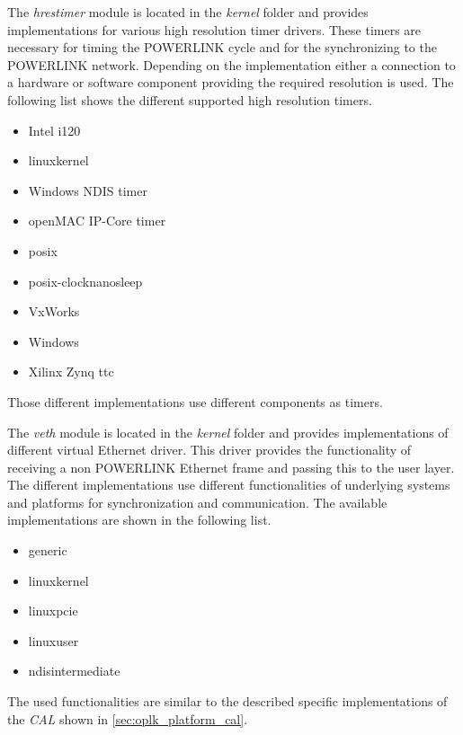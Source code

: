 \begin{description}[leftmargin=1cm]
    \item[hrestimer] The \emph{hrestimer} module is located in the \emph{kernel} folder and provides implementations for various high resolution timer drivers.
    These timers are necessary for timing the POWERLINK cycle and for the synchronizing to the POWERLINK network.
    Depending on the implementation either a connection to a hardware or software component providing the required resolution is used.
    The following list shows the different supported high resolution timers.
    \begin{multicols}{3}
        \begin{itemize}
            \item Intel i120
            \item linuxkernel
            \item Windows NDIS timer
            \item openMAC IP-Core timer
            \item posix
            \item posix-clocknanosleep
            \item VxWorks
            \item Windows
            \item Xilinx Zynq ttc
        \end{itemize}
    \end{multicols}
    Those different implementations use different components as timers.
    
    \item[veth] The \emph{veth} module is located in the \emph{kernel} folder and provides implementations of different virtual Ethernet driver.
    This driver provides the functionality of receiving a non POWERLINK Ethernet frame and passing this to the user layer.
    The different implementations use different functionalities of underlying systems and platforms for synchronization and communication.
    The available implementations are shown in the following list.
    \begin{multicols}{3}
        \begin{itemize}
            \item generic
            \item linuxkernel
            \item linuxpcie
            \item linuxuser
            \item ndisintermediate
        \end{itemize}
    \end{multicols}
    The used functionalities are similar to the described specific implementations of the \emph{CAL} shown in \ref{sec:oplk_platform_cal}.\\
    

\end{description}
